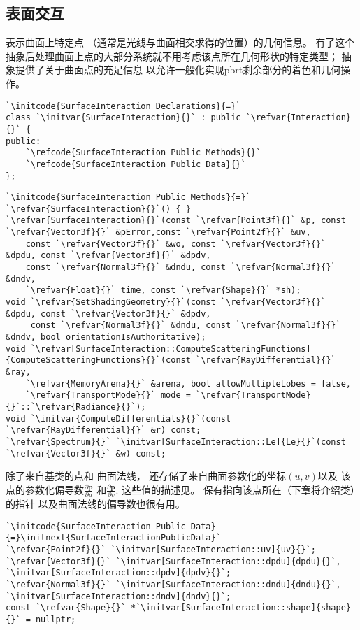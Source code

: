 \subsection{表面交互}\label{sub:表面交互}
表示曲面上特定点
（通常是光线与曲面相交求得的位置）的几何信息。
有了这个抽象后处理曲面上点的大部分系统就不用考虑该点所在几何形状的特定类型；
抽象提供了关于曲面点的充足信息
以允许一般化实现pbrt剩余部分的着色和几何操作。
\begin{lstlisting}
`\initcode{SurfaceInteraction Declarations}{=}`
class `\initvar{SurfaceInteraction}{}` : public `\refvar{Interaction}{}` {
public:
    `\refcode{SurfaceInteraction Public Methods}{}`
    `\refcode{SurfaceInteraction Public Data}{}`
};
\end{lstlisting}
\begin{lstlisting}
`\initcode{SurfaceInteraction Public Methods}{=}`
`\refvar{SurfaceInteraction}{}`() { }
`\refvar{SurfaceInteraction}{}`(const `\refvar{Point3f}{}` &p, const `\refvar{Vector3f}{}` &pError,const `\refvar{Point2f}{}` &uv,
    const `\refvar{Vector3f}{}` &wo, const `\refvar{Vector3f}{}` &dpdu, const `\refvar{Vector3f}{}` &dpdv,
    const `\refvar{Normal3f}{}` &dndu, const `\refvar{Normal3f}{}` &dndv,
    `\refvar{Float}{}` time, const `\refvar{Shape}{}` *sh);
void `\refvar{SetShadingGeometry}{}`(const `\refvar{Vector3f}{}` &dpdu, const `\refvar{Vector3f}{}` &dpdv,
     const `\refvar{Normal3f}{}` &dndu, const `\refvar{Normal3f}{}` &dndv, bool orientationIsAuthoritative);
void `\refvar[SurfaceInteraction::ComputeScatteringFunctions]{ComputeScatteringFunctions}{}`(const `\refvar{RayDifferential}{}` &ray,
    `\refvar{MemoryArena}{}` &arena, bool allowMultipleLobes = false,
    `\refvar{TransportMode}{}` mode = `\refvar{TransportMode}{}`::`\refvar{Radiance}{}`);
void `\initvar{ComputeDifferentials}{}`(const `\refvar{RayDifferential}{}` &r) const;
`\refvar{Spectrum}{}` `\initvar[SurfaceInteraction::Le]{Le}{}`(const `\refvar{Vector3f}{}` &w) const;
\end{lstlisting}

除了来自基类的点和
曲面法线，
还存储了来自曲面参数化的坐标$(u,v)$以及
该点的参数化偏导数$\displaystyle\frac{\partial \bm p}{\partial u}$
和$\displaystyle\frac{\partial \bm p}{\partial v}$.
这些值的描述见。
保有指向该点所在（下章将介绍类）的指针
以及曲面法线的偏导数也很有用。
\begin{lstlisting}
`\initcode{SurfaceInteraction Public Data}{=}\initnext{SurfaceInteractionPublicData}`
`\refvar{Point2f}{}` `\initvar[SurfaceInteraction::uv]{uv}{}`;
`\refvar{Vector3f}{}` `\initvar[SurfaceInteraction::dpdu]{dpdu}{}`, `\initvar[SurfaceInteraction::dpdv]{dpdv}{}`;
`\refvar{Normal3f}{}` `\initvar[SurfaceInteraction::dndu]{dndu}{}`, `\initvar[SurfaceInteraction::dndv]{dndv}{}`;
const `\refvar{Shape}{}` *`\initvar[SurfaceInteraction::shape]{shape}{}` = nullptr;
\end{lstlisting}

